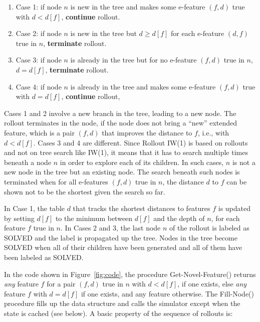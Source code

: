 \documentclass[letterpaper]{article}
\begin{document}
\begin{enumerate}[$\bullet$]
  \item Case 1: if node $n$ is new in the tree and makes some e-feature $(f,d)$ true with $d < d[f]$, \textbf{continue} rollout.
  \item Case 2: if node $n$ is new in the tree but $d \geq d[f]$ for each e-feature $(d,f)$ true in $n$, \textbf{terminate} rollout.
  \item Case 3: if node $n$ is already in the tree but for no e-feature $(f,d)$ true in $n$, $d = d[f]$, \textbf{terminate} rollout.
  \item Case 4: if node $n$ is already in the tree and makes some e-feature $(f,d)$ true with $d = d[f]$, \textbf{continue} rollout,
\end{enumerate}

Cases 1 and 2 involve a  new branch in the tree, leading to a new node. The rollout terminates in the node, if the node  does not bring
a ``new'' extended feature, which is a pair $(f,d)$ that improves the distance to $f$, i.e., with  $d < d[f]$.
Cases 3 and 4 are different. Since Rollout IW(1) is based on rollouts and not on  tree search like IW(1), it means
that it has to search multiple times beneath a node $n$ in order to explore each of its children.
In such cases, $n$ is not a new node in the tree but an existing  node.
The  search beneath such  nodes is  terminated when for all e-features $(f,d)$ true in $n$,
the distance $d$ to $f$ can be shown not to be the shortest  given the search so far.

In Case 1, the table $d$ that tracks the shortest distances to features $f$ is updated
by setting $d[f]$ to  the minimum between  $d[f]$ and the depth of  $n$, for each feature $f$ true in $n$.
In Cases 2 and 3, the last  node $n$ of the rollout is labeled as SOLVED and the label is propagated
up the tree. Nodes  in the tree become  SOLVED when all of their children have been
generated and all of them have been labeled as SOLVED.

In the code shown in  Figure~\ref{fig:code}, the procedure
Get-Novel-Feature() returns \emph{any}  feature $f$ for a pair $(f,d)$ true in $n$
with $d < d[f]$,  if one exists, else  \emph{any}  feature $f$ with  $d=d[f]$ if one exists,
and any feature otherwise.  The Fill-Node() procedure fills up the data structure and
calls  the simulator except when the state is cached (see below).
A basic property of the sequence of rollouts is:
\end{document}
